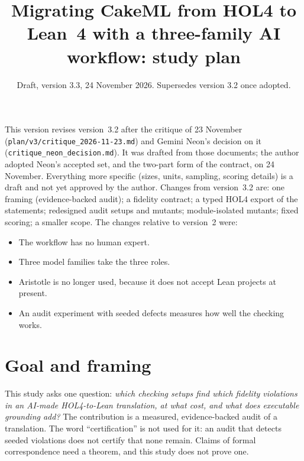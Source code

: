 \documentclass[11pt,a4paper]{article}
\title{Migrating CakeML from HOL4 to Lean~4 with a three-family AI workflow: study plan}
\author{Draft, version 3.3, 24 November 2026. Supersedes version 3.2 once adopted.}
\date{}
\newcommand{\code}[1]{\texttt{#1}}
\begin{document}
\sloppy
\maketitle

\noindent This version revises version~3.2 after the critique of 23 November (\code{plan/v3/critique\_2026-11-23.md}) and Gemini Neon's decision on it (\code{critique\_neon\_decision.md}). It was drafted from those documents; the author adopted Neon's accepted set, and the two-part form of the contract, on 24 November. Everything more specific (sizes, units, sampling, scoring details) is a draft and not yet approved by the author. Changes from version~3.2 are: one framing (evidence-backed audit); a fidelity contract; a typed HOL4 export of the statements; redesigned audit setups and mutants; module-isolated mutants; fixed scoring; a smaller scope. The changes relative to version~2 were:
\begin{itemize}
\item The workflow has no human expert.
\item Three model families take the three roles.
\item Aristotle is no longer used, because it does not accept Lean projects at present.
\item An audit experiment with seeded defects measures how well the checking works.
\end{itemize}

\section{Goal and framing}\label{sec:goal}
This study asks one question: \emph{which checking setups find which fidelity violations in an AI-made HOL4-to-Lean translation, at what cost, and what does executable grounding add?} The contribution is a measured, evidence-backed audit of a translation. The word ``certification'' is not used for it: an audit that detects seeded violations does not certify that none remain. Claims of formal correspondence need a theorem, and this study does not prove one.
\end{document}
